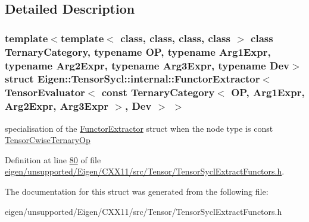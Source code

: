 \subsection{Detailed Description}
\subsubsection*{template$<$template$<$ class, class, class, class $>$ class Ternary\+Category, typename OP, typename Arg1\+Expr, typename Arg2\+Expr, typename Arg3\+Expr, typename Dev$>$\newline
struct Eigen\+::\+Tensor\+Sycl\+::internal\+::\+Functor\+Extractor$<$ Tensor\+Evaluator$<$ const Ternary\+Category$<$ O\+P, Arg1\+Expr, Arg2\+Expr, Arg3\+Expr $>$, Dev $>$ $>$}

specialisation of the \hyperlink{struct_eigen_1_1_tensor_sycl_1_1internal_1_1_functor_extractor}{Functor\+Extractor} struct when the node type is const \hyperlink{class_eigen_1_1_tensor_cwise_ternary_op}{Tensor\+Cwise\+Ternary\+Op} 

Definition at line \hyperlink{eigen_2unsupported_2_eigen_2_c_x_x11_2src_2_tensor_2_tensor_sycl_extract_functors_8h_source_l00080}{80} of file \hyperlink{eigen_2unsupported_2_eigen_2_c_x_x11_2src_2_tensor_2_tensor_sycl_extract_functors_8h_source}{eigen/unsupported/\+Eigen/\+C\+X\+X11/src/\+Tensor/\+Tensor\+Sycl\+Extract\+Functors.\+h}.



The documentation for this struct was generated from the following file\+:\begin{DoxyCompactItemize}
\item 
eigen/unsupported/\+Eigen/\+C\+X\+X11/src/\+Tensor/\+Tensor\+Sycl\+Extract\+Functors.\+h\end{DoxyCompactItemize}
